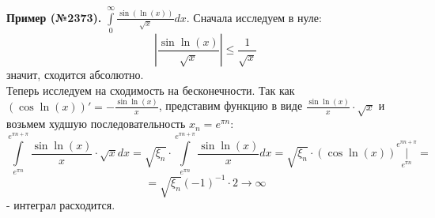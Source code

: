 \textbf{Пример (№2373).}
$\int\limits_{0}^{\infty}\frac{\sin(\ln(x))}{\sqrt{x}}dx$. Сначала исследуем
в нуле:
$$\left| \frac{\sin\ln(x)}{\sqrt{x}} \right|\leqslant \frac{1}{\sqrt{x}}$$ 
значит, сходится абсолютно.\\
Теперь исследуем на сходимость на бесконечности. Так как 
$(\cos\ln(x))'=- \frac{\sin\ln(x)}{x}$, представим функцию в виде 
$\frac{\sin\ln(x)}{x}\cdot \sqrt{x}$ и возьмем худшую последовательность
$x_n=e^{\pi n}$:
$$\int\limits_{e^{\pi n}}^{e^{\pi n+\pi}}\frac{\sin\ln(x)}{x}\cdot\sqrt{x}dx=
\sqrt{\xi_n}\cdot\int\limits_{e^{\pi n}}^{e^{\pi n+\pi}}\frac{\sin\ln(x)}{x}dx=
\sqrt{\xi_n}\cdot(\cos\ln(x))\big|\limits_{e^{\pi n}}^{e^{\pi n+\pi}}=
$$ $$=\sqrt{\xi_n}(-1)^{-1}\cdot 2\to \infty$$
- интеграл расходится.
















